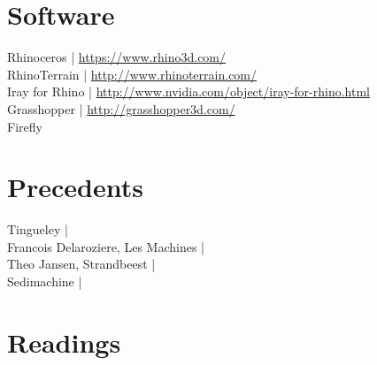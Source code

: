 \documentclass[11pt,article,oneside]{memoir}
\begin{document}
\section{Software}
Rhinoceros | \url{https://www.rhino3d.com/}\\
RhinoTerrain | \url{http://www.rhinoterrain.com/}\\
Iray for Rhino | \url{http://www.nvidia.com/object/iray-for-rhino.html}\\
Grasshopper | \url{http://grasshopper3d.com/}\\
Firefly %



\section{Precedents}

\noindent
Tingueley | \url{}\\
Francois Delaroziere, Les Machines | \url{}\\
Theo Jansen, Strandbeest  | \url{}\\
%
Sedimachine | \url{}\\


\section{Readings}
\renewcommand*{\bibfont}{\normalsize} %
\vspace*{0.5cm}
\nocite{*}
\setlength{}
\printbibliography[heading=none]
\end{document}
